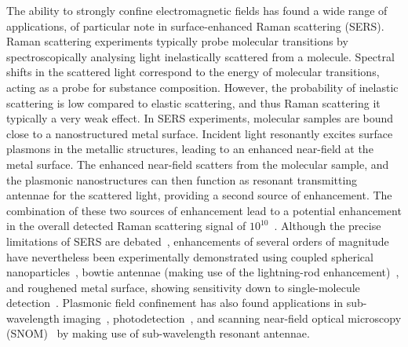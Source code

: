 The ability to strongly confine electromagnetic fields has found a wide range of applications, of particular note in surface-enhanced Raman scattering (SERS). Raman scattering experiments typically probe molecular transitions by spectroscopically analysing light inelastically scattered from a molecule. Spectral shifts in the scattered light correspond to the energy of molecular transitions, acting as a probe for substance composition. However, the probability of inelastic scattering is low compared to elastic scattering, and thus Raman scattering it typically a very weak effect. In SERS experiments, molecular samples are bound close to a nanostructured metal surface. Incident light resonantly excites surface plasmons in the metallic structures, leading to an enhanced near-field at the metal surface. The enhanced near-field scatters from the molecular sample, and the plasmonic nanostructures can then function as resonant transmitting antennae for the scattered light, providing a second source of enhancement. The combination of these two sources of enhancement lead to a potential enhancement in the overall detected Raman scattering signal of $10^{10}$~\cite{Fromm2006}. Although the precise limitations of SERS are debated~\cite{LeRu2007}, enhancements of several orders of magnitude have nevertheless been experimentally demonstrated using coupled spherical nanoparticles~\cite{Talley2005}, bowtie antennae (making use of the lightning-rod enhancement)~\cite{Fromm2006}, and roughened metal surface, showing sensitivity down to single-molecule detection~\cite{Blackie2009}. Plasmonic field confinement has also found applications in sub-wavelength imaging~\cite{Huang2010a}, photodetection~\cite{Ishi2005}, and scanning near-field optical microscopy (SNOM)~\cite{Wenzel2008} by making use of sub-wavelength resonant antennae.

